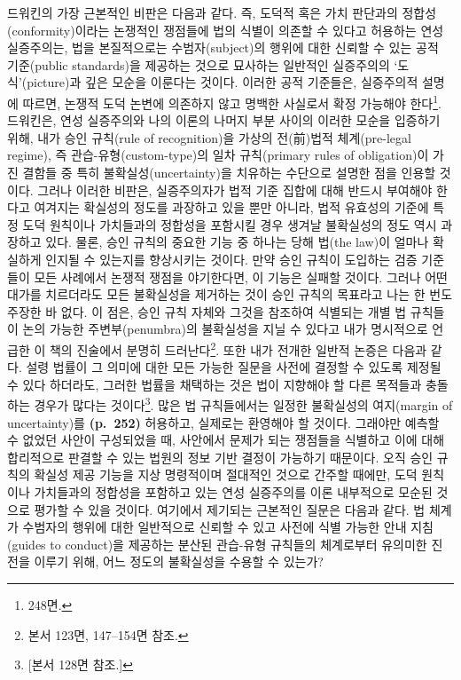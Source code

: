 드워킨의 가장 근본적인 비판은 다음과 같다. 즉, 도덕적 혹은 가치 판단과의
정합성(conformity)이라는 논쟁적인 쟁점들에 법의 식별이 의존할 수 있다고
허용하는 연성 실증주의는, 법을 본질적으로는 수범자(subject)의 행위에
대한 신뢰할 수 있는 공적 기준(public standards)을 제공하는 것으로
묘사하는 일반적인 실증주의의 `도식'(picture)과 깊은 모순을 이룬다는
것이다. 이러한 공적 기준들은, 실증주의적 설명에 따르면, 논쟁적 도덕
논변에 의존하지 않고 명백한 사실로서 확정 가능해야 한다\footnote{
  248면.}. 드워킨은, 연성 실증주의와 나의 이론의 나머지 부분 사이의
이러한 모순을 입증하기 위해, 내가 승인 규칙(rule of recognition)을
가상의 전(前)법적 체계(pre-legal regime), 즉 관습-유형(custom-type)의
일차 규칙(primary rules of obligation)이 가진 결함들 중 특히
불확실성(uncertainty)을 치유하는 수단으로 설명한 점을 인용할 것이다.
그러나 이러한 비판은, 실증주의자가 법적 기준 집합에 대해 반드시 부여해야
한다고 여겨지는 확실성의 정도를 과장하고 있을 뿐만 아니라, 법적 유효성의
기준에 특정 도덕 원칙이나 가치들과의 정합성을 포함시킬 경우 생겨날
불확실성의 정도 역시 과장하고 있다. 물론, 승인 규칙의 중요한 기능 중
하나는 당해 법(the law)이 얼마나 확실하게 인지될 수 있는지를 향상시키는
것이다. 만약 승인 규칙이 도입하는 검증 기준들이 모든 사례에서 논쟁적
쟁점을 야기한다면, 이 기능은 실패할 것이다. 그러나 어떤 대가를
치르더라도 모든 불확실성을 제거하는 것이 승인 규칙의 목표라고 나는 한
번도 주장한 바 없다. 이 점은, 승인 규칙 자체와 그것을 참조하여 식별되는
개별 법 규칙들이 논의 가능한 주변부(penumbra)의 불확실성을 지닐 수
있다고 내가 명시적으로 언급한 이 책의 진술에서 분명히
드러난다\footnote{본서 123면, 147--154면 참조.}. 또한 내가 전개한 일반적
논증은 다음과 같다. 설령 법률이 그 의미에 대한 모든 가능한 질문을 사전에
결정할 수 있도록 제정될 수 있다 하더라도, 그러한 법률을 채택하는 것은
법이 지향해야 할 다른 목적들과 충돌하는 경우가 많다는 것이다\footnote{{[}본서
  128면 참조.{]}}. 많은 법 규칙들에서는 일정한 불확실성의 여지(margin of
uncertainty)를 \textbf{(p.~252)} 허용하고, 실제로는 환영해야 할 것이다.
그래야만 예측할 수 없었던 사안이 구성되었을 때, 사안에서 문제가 되는
쟁점들을 식별하고 이에 대해 합리적으로 판결할 수 있는 법원의 정보 기반
결정이 가능하기 때문이다. 오직 승인 규칙의 확실성 제공 기능을 지상
명령적이며 절대적인 것으로 간주할 때에만, 도덕 원칙이나 가치들과의
정합성을 포함하고 있는 연성 실증주의를 이론 내부적으로 모순된 것으로
평가할 수 있을 것이다. 여기에서 제기되는 근본적인 질문은 다음과 같다. 법
체계가 수범자의 행위에 대한 일반적으로 신뢰할 수 있고 사전에 식별 가능한
안내 지침(guides to conduct)을 제공하는 분산된 관습-유형 규칙들의
체계로부터 유의미한 진전을 이루기 위해, 어느 정도의 불확실성을 수용할 수
있는가?

